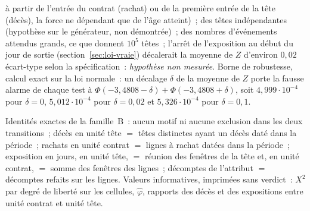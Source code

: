 \documentclass[a4paper,11pt]{article}
\begin{document}
\begin{itemize}[leftmargin=*, itemsep=2pt]
    à partir de l'entrée du contrat (rachat) ou de la première entrée de
    la tête (décès), la force ne dépendant que de l'âge atteint)~; des
    têtes indépendantes (hypothèse sur le générateur, non démontrée)~; des nombres d'événements attendus grands, ce que
    donnent $10^{5}$ têtes~; l'arrêt de
    l'exposition au début du jour de sortie (section~\ref{sec:loi-vraie})
    décalerait la moyenne de $Z$ d'environ $0{,}02$ écart-type selon la
    spécification~: \emph{hypothèse non mesurée}. Borne de robustesse,
    calcul exact sur la loi normale~: un décalage $\delta$ de la moyenne de
    $Z$ porte la fausse alarme de chaque test à
    $\Phi(-3{,}4808 - \delta) + \Phi(-3{,}4808 + \delta)$, soit
    $4{,}999 \cdot 10^{-4}$ pour $\delta = 0$, $5{,}012 \cdot 10^{-4}$ pour
    $\delta = 0{,}02$ et $5{,}326 \cdot 10^{-4}$ pour $\delta = 0{,}1$.
\end{itemize}
Identités exactes de la famille~B~: aucun motif ni aucune exclusion dans les
deux transitions~; décès en unité tête $=$ têtes distinctes ayant un décès
daté dans la période~; rachats en unité contrat $=$ lignes à rachat datées
dans la période~; exposition en jours, en unité tête, $=$ réunion des
fenêtres de la tête et, en unité contrat, $=$ somme des fenêtres des
lignes~; décomptes de l'attribut $=$ décomptes refaits sur les lignes.
Valeurs informatives, imprimées sans verdict~: $X^{2}$ par degré de liberté
sur les cellules, $\hat\varphi$, rapports des décès et des expositions
entre unité contrat et unité tête.
\end{document}

